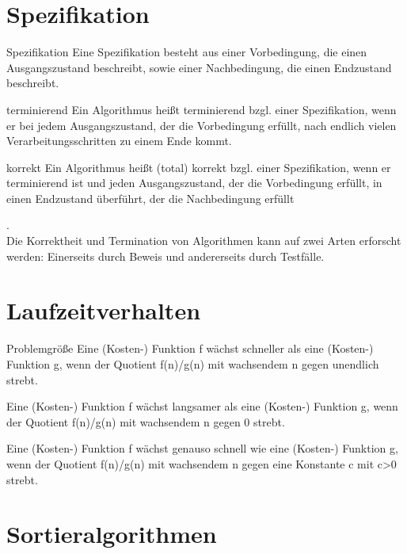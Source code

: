 \section{Spezifikation}
\begin{zitat}{Spezifikation}
 Eine Spezifikation besteht aus einer Vorbedingung, die einen Ausgangszustand beschreibt, sowie einer Nachbedingung, die einen Endzustand beschreibt.
\end{zitat}
\begin{zitat}{terminierend}
 Ein Algorithmus heißt terminierend bzgl. einer Spezifikation, wenn er bei jedem Ausgangszustand, der die Vorbedingung erfüllt, nach endlich vielen Verarbeitungsschritten zu einem Ende kommt.
\end{zitat}
\begin{zitat}{korrekt}
Ein Algorithmus heißt (total) korrekt bzgl. einer Spezifikation, wenn er terminierend ist und jeden Ausgangszustand, der die Vorbedingung erfüllt, in einen Endzustand überführt, der die Nachbedingung erfüllt
\end{zitat}
.\\
Die Korrektheit und Termination von Algorithmen kann auf zwei Arten erforscht werden:
Einerseits durch Beweis und andererseits durch Testfälle.

\section{Laufzeitverhalten}
\begin{zitat}{Problemgröße}
 Eine (Kosten-) Funktion f wächst schneller als eine (Kosten-) Funktion g, wenn der Quotient f(n)/g(n) mit wachsendem n gegen unendlich strebt.

Eine (Kosten-) Funktion f wächst langsamer als eine (Kosten-) Funktion g, wenn der Quotient f(n)/g(n) mit wachsendem n gegen 0 strebt.

Eine (Kosten-) Funktion f wächst genauso schnell wie eine (Kosten-) Funktion g, wenn der Quotient f(n)/g(n) mit wachsendem n gegen eine Konstante c mit c>0 strebt.
\end{zitat}



\newpage
\section{Sortieralgorithmen}
